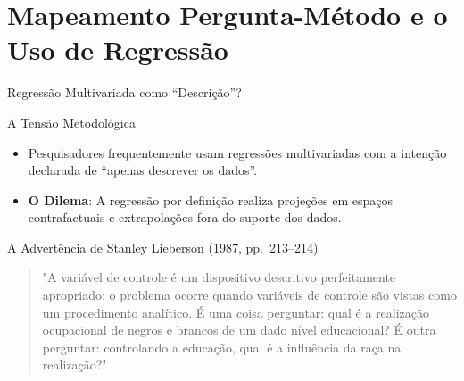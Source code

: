 \documentclass[
  ignorenonframetext,
  aspectratio=169,
  brazilian,
  t,
  10pt]{beamer}
\providecommand{\tightlist}{%
  \setlength{\itemsep}{0pt}\setlength{\parskip}{0pt}}
\begin{document}
\section{Mapeamento Pergunta-Método e o Uso de
Regressão}\label{mapeamento-pergunta-muxe9todo-e-o-uso-de-regressuxe3o}

\begin{frame}{Regressão Multivariada como ``Descrição''?}
\protect{}\label{regressuxe3o-multivariada-como-descriuxe7uxe3o}
\begin{block}{A Tensão Metodológica}
\protect{}\label{a-tensuxe3o-metodoluxf3gica}
\begin{itemize}
\tightlist
\item
  Pesquisadores frequentemente usam regressões multivariadas com a
  intenção declarada de ``apenas descrever os dados''.
\item
  \textbf{O Dilema}: A regressão por definição realiza projeções em
  espaços contrafactuais e extrapolações fora do suporte dos dados.
\end{itemize}
\end{block}

\begin{block}{A Advertência de Stanley Lieberson (1987, pp.~213--214)}
\protect{}\label{a-advertuxeancia-de-stanley-lieberson-1987-pp.-213214}
\begin{quote}
"A variável de controle é um dispositivo descritivo perfeitamente apropriado; o problema ocorre quando variáveis de controle são vistas como um procedimento analítico. É uma coisa perguntar: qual é a realização ocupacional de negros e brancos de um dado nível educacional? É outra perguntar: controlando a educação, qual é a influência da raça na realização?"
\end{quote}
\end{block}
\end{frame}
\end{document}
